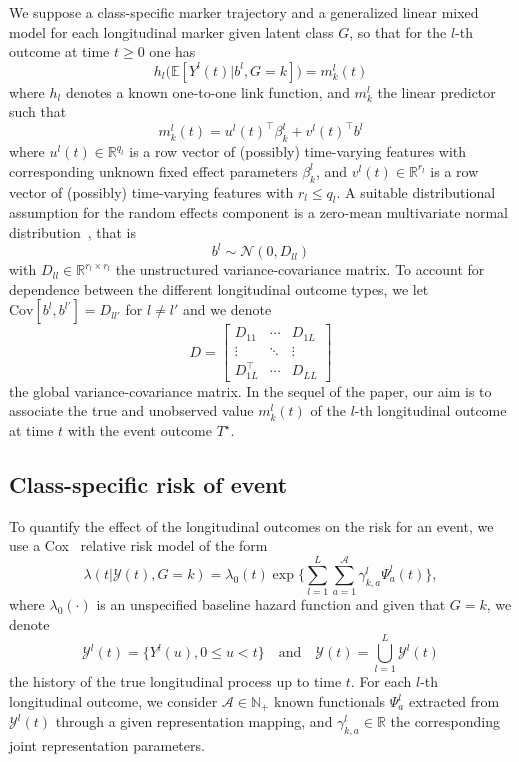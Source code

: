 \documentclass[11pt]{article}
\newcommand{\cY}{\mathcal Y}
\newcommand{\cN}{\mathcal N}
\newcommand{\cA}{\mathcal A}
\newcommand{\R}{\mathds R}
\newcommand{\N}{\mathds N}
\newcommand{\E}{\mathds E}
\begin{document}
We suppose a class-specific marker trajectory and a generalized linear mixed model for each longitudinal marker given latent class $G$, so that for the $l$-th outcome at time $t \geq 0$ one has
\begin{equation}
  \label{eq:link-function}
  h_l\big(\E[Y^l(t)|b^l, G=k]\big) = m_k^l(t)
 \end{equation}
where $h_l$ denotes a known one-to-one link function, and $m_k^l$ the linear predictor such that
\[ m_k^l(t) = u^l(t)^\top\beta_k^l + v^l(t)^\top b^l \]
where $u^l(t) \in \R^{q_l}$ is a row vector of (possibly) time-varying features with corresponding unknown fixed effect parameters $\beta_k^l$, and $v^l(t) \in \R^{r_l}$ is a row vector of (possibly) time-varying features with $r_l \leq q_l$.
A suitable distributional assumption for the random effects component is a zero-mean multivariate normal distribution~\citep{hickey2016joint}, that is
\begin{equation}
   \label{eq:random-effect-law}
   b^l \sim \cN(0, D_{ll})
 \end{equation} 
with $D_{ll} \in \R^{r_l \times r_l}$ the unstructured variance-covariance matrix. 
To account for dependence between the different longitudinal outcome types, we let $\text{Cov}[b^l,b^{l'}] = D_{ll'}$ for $l \ne l'$ and we denote
\[ D = 
\begin{bmatrix}
  D_{11} & \cdots & D_{1L}\\
  \vdots &  \ddots & \vdots \\
  D_{1L}^\top & \cdots & D_{LL}
\end{bmatrix}
\]
the global variance-covariance matrix.
In the sequel of the paper, our aim is to associate the true and unobserved value $m_k^l(t)$ of the $l$-th longitudinal outcome at time $t$ with the event outcome $T^\star$.

\subsection{Class-specific risk of event}

To quantify the effect of the longitudinal outcomes on the risk for an event, we use a Cox~\citep{Cox1972JRSS} relative risk model of the form
\begin{equation}
  \label{eq:intensity-model}
  \lambda(t|\cY(t), G = k) = \lambda_0(t) \exp \Big\{\sum_{l=1}^L \sum_{a=1}^\cA {\gamma_{k,a}^l} \Psi_a^l(t) \Big\},
\end{equation}
where $\lambda_0(\cdot)$ is an unspecified baseline hazard function and given that $G = k$, we denote 
\[\cY^l(t) = \{Y^l(u), 0 \leq u < t\} \quad \text{and} \quad \cY(t) = \bigcup_{l=1}^L \cY^l(t)\] 
the history of the true longitudinal process up to time $t$.
For each $l$-th longitudinal outcome, we consider $\cA \in \N_+$ known functionals $\Psi_a^l$ extracted from $\cY^l(t)$ through a given representation mapping, and $\gamma_{k,a}^l \in \R$ the corresponding joint representation parameters.  
\end{document}
